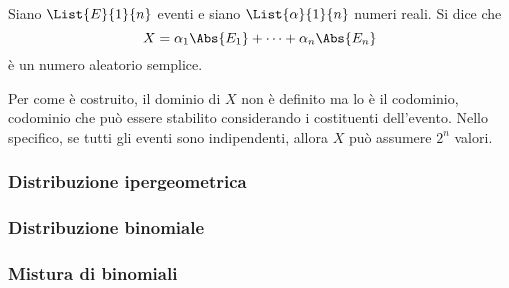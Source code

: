 \documentclass{subfiles}
\begin{document}
Siano $\List{E}{1}{n}$ eventi e siano $\List{\alpha}{1}{n}$ numeri reali.
Si dice che
$$
    X = \alpha_{1}\Abs{E_{1}} + \cdots + \alpha_{n}\Abs{E_{n}}
$$
è un numero aleatorio semplice.

Per come è costruito, il dominio di $X$ non è definito ma lo è il codominio,
codominio che può essere stabilito considerando i costituenti dell'evento.
Nello specifico, se tutti gli eventi sono indipendenti, allora $X$ può assumere $2^{n}$ valori.

\subsubsection{Distribuzione ipergeometrica}

\clearpage

\subsubsection{Distribuzione binomiale}


\subsubsection{Mistura di binomiali}

\end{document}
